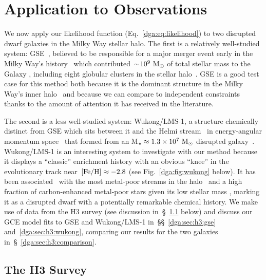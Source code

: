 
\section{Application to Observations}
\label{dga:sec:h3}

We now apply our likelihood function (Eq.~\ref{dga:eq:likelihood}) to two
disrupted dwarf galaxies in the Milky Way stellar halo.
The first is a relatively well-studied system: GSE~\citep{Belokurov2018,
Helmi2018, Haywood2018, Myeong2018, Mackereth2019a}, believed to be responsible
for a major merger event early in the Milky Way's history~\citep{Gallart2019,
Bonaca2020, Chaplin2020, Montalban2021, Xiang2022} which
contributed~$\sim$$10^9~\text{M}_\odot$ of total stellar mass to the Galaxy
\citep{Deason2019, Fattahi2019, Mackereth2019a, Vincenzo2019b, Kruijssen2020,
Han2022}, including eight globular clusters in the stellar
halo~\citep{Myeong2018, Massari2019, Kruijssen2019, Forbes2020}.
GSE is a good test case for this method both because it is the dominant
structure in the Milky Way's inner halo~\citep{Helmi2018} and because we can
compare to independent constraints thanks to the amount of attention it has
received in the literature.



The second is a less well-studied system: Wukong/LMS-1, a structure chemically
distinct from GSE which sits between it and the Helmi stream~\citep{Helmi1999}
in energy-angular momentum space~\citep{Naidu2020, Yuan2020} that
formed from an M$_\star \approx 1.3\times10^{7}~\text{M}_\odot$ disrupted
galaxy~\citep{Naidu2022}.
Wukong/LMS-1 is an interesting system to investigate with our method
because it displays a ``classic'' enrichment history with an obvious ``knee''
in the evolutionary track near~$\text{[Fe/H]} \approx -2.8$ (see Fig.~\ref{dga:fig:wukong}
below).
It has been associated~\citep{Malhan2022} with the most metal-poor streams in
the halo~\citep[e.g.,][]{Roederer2019, Wan2020, Martin2022} and a high fraction
of carbon-enhanced metal-poor stars given its low stellar mass
\citep{Shank2022, Zepeda2023}, marking it as a disrupted dwarf with a
potentially remarkable chemical history.
We make use of data from the H3 survey (see discussion
in~\S~\ref{dga:sec:h3:survey} below) and discuss our GCE model fits to GSE and
Wukong/LMS-1 in~\S\S~\ref{dga:sec:h3:gse} and~\ref{dga:sec:h3:wukong}, comparing our
results for the two galaxies in~\S~\ref{dga:sec:h3:comparison}.

\subsection{The H3 Survey}
\label{dga:sec:h3:survey}

